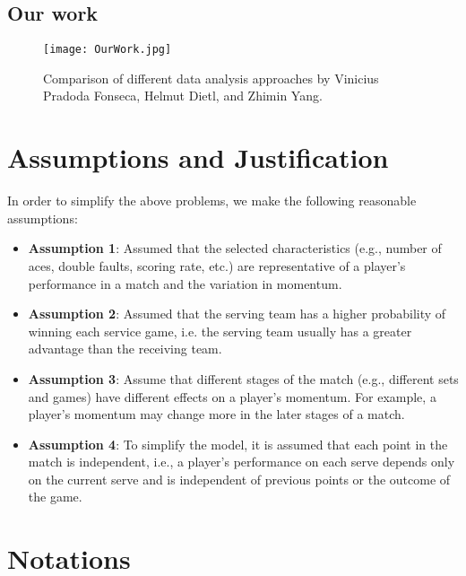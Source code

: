 \documentclass{mcmthesis}
\begin{document}
\subsection{Our work}

    \begin{figure}[ht]
        \centering
        \texttt{[image: OurWork.jpg]} %
        \caption{Comparison of different data analysis approaches by Vinicius Pradoda Fonseca, Helmut Dietl, and Zhimin Yang.}
        \label{fig:literature_review}
    \end{figure}
\newpage
\section{Assumptions and Justification}

In order to simplify the above problems, we make the following reasonable assumptions:

\begin{itemize}
    \item[] {\bf Assumption 1}: Assumed that the selected characteristics (e.g., number of aces, double faults, scoring rate, etc.) are representative of a player's performance in a match and the variation in momentum.

    \item[] {\bf Assumption 2}: Assumed that the serving team has a higher probability of winning each service game, i.e. the serving team usually has a greater advantage than the receiving team.

    \item[] {\bf Assumption 3}: Assume that different stages of the match (e.g., different sets and games) have different effects on a player's momentum. For example, a player's momentum may change more in the later stages of a match.

    \item[] {\bf Assumption 4}: To simplify the model, it is assumed that each point in the match is independent, i.e., a player's performance on each serve depends only on the current serve and is independent of previous points or the outcome of the game.

\end{itemize}

\section{Notations}
\end{document}
